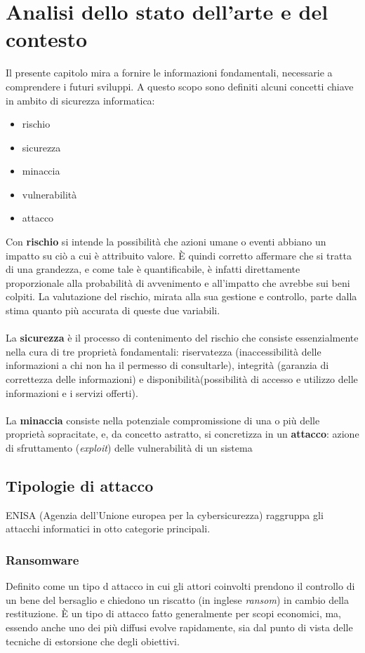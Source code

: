 \documentclass[12pt,a4paper,openright,twoside]{report}
\begin{document}
\chapter{Analisi dello stato dell'arte e del contesto}
Il presente capitolo mira a fornire le informazioni fondamentali, necessarie a comprendere i futuri sviluppi. A questo scopo sono definiti alcuni concetti chiave in ambito di sicurezza informatica:
\begin{itemize}
    \item rischio
    \item sicurezza
    \item minaccia
    \item vulnerabilit\`a
    \item attacco
\end{itemize}
Con \textbf{rischio} si intende la possibilit\`a che azioni umane o eventi  abbiano un impatto su ci\`o a cui \`e attribuito valore. \`E quindi corretto affermare che si tratta di una grandezza, e come tale \`e quantificabile, \`e infatti direttamente proporzionale alla probabilit\`a di avvenimento e all'impatto che avrebbe sui beni colpiti. La valutazione del rischio, mirata alla sua gestione e controllo, parte dalla stima quanto pi\`u accurata di queste due variabili.\\
\\
La \textbf{sicurezza} \`e il processo di contenimento del rischio che consiste essenzialmente nella cura di tre propriet\`a fondamentali: riservatezza (inaccessibilit\`a delle informazioni a chi non ha il permesso di consultarle), integrit\`a (garanzia di correttezza delle informazioni) e disponibilit\`a(possibilit\`a di accesso e utilizzo delle informazioni e i servizi offerti).\\
\\
La \textbf{minaccia} consiste nella potenziale compromissione di una o pi\`u delle propriet\`a sopracitate, e, da concetto astratto, si concretizza in un \textbf{attacco}: azione di sfruttamento (\textit{exploit}) delle vulnerabilit\`a di un sistema\\

\section{Tipologie di attacco}
ENISA (Agenzia dell'Unione europea per la cybersicurezza) raggruppa gli attacchi informatici in otto categorie principali.\cite{enisa_threat_landscape}
\subsection{Ransomware}
Definito come un tipo d attacco in cui gli attori coinvolti prendono il controllo di un bene del bersaglio e chiedono un riscatto (in inglese \textit{ransom}) in cambio della restituzione. \`E un tipo di attacco fatto generalmente per scopi economici, ma, essendo anche uno dei pi\`u diffusi evolve rapidamente, sia dal punto di vista delle tecniche di estorsione che degli obiettivi.\\
\end{document}
